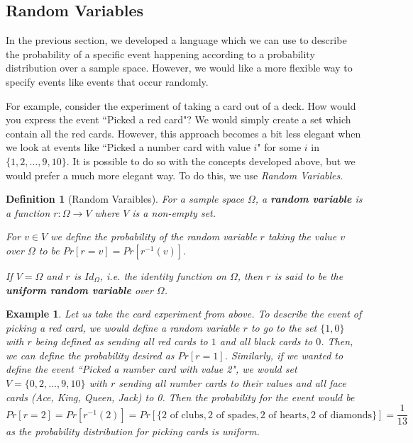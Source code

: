 \documentclass[12pt,a4paper]{article}
\newtheorem{definition}[theorem]{Definition}
\newtheorem{example}[theorem]{Example}
\begin{document}
\subsection{Random Variables}

In the previous section, we developed a language which we can use to describe
the probability of a specific event happening according to a probability
distribution over a sample space. However, we would like a more flexible way to
specify events like events that occur randomly. 

For example, consider the experiment of taking a card out of a deck. How would
you express the event ``Picked a red card"? We would simply create a set which
contain all the red cards. However, this approach becomes a bit less elegant
when we look at events like ``Picked a number card with value $i$" for some $i$
in $\{1,2,\ldots,9,10\}$. It is possible to do so with the concepts developed above, but
we would prefer a much more elegant way. To do this, we use \textit{Random
Variables}.

\begin{definition}[Random Varaibles]
For a sample space $\Omega$, a \textbf{random variable} is a function $r:\Omega
\rightarrow V$ where $V$ is a non-empty set.

For $v \in V$ we define the probability of the random variable $r$
taking the value $v$ over $\Omega$ to be $Pr[r=v] = Pr[r^{-1}(v)].$ 

If $V=\Omega$ and $r$ is $Id_\Omega$, i.e. the identity function on $\Omega$,
then $r$ is said to be the \textbf{uniform random variable} over $\Omega$.
\end{definition}
\begin{example}
Let us take the card experiment from above. To describe the event of picking a
red card, we would define a random variable $r$ to go to the set $\{1,0\}$ with $r$
being defined as sending all red cards to $1$ and all black cards to $0$. Then,
we can define the probability desired as $Pr[r=1]$. Similarly, if we wanted to define the
event ``Picked a number card with value 2", we would set $V =
\{0,2,\ldots,9,10\}$ with $r$ sending all number cards to their values and all
face cards (Ace, King, Queen, Jack) to 0. Then the probability for the event
would be \[Pr[r=2] = Pr[r^{-1}(2)] = Pr[\{2 \mbox{ of clubs} , 2 \mbox{ of
spades}, 2 \mbox{ of hearts}, 2 \mbox{ of diamonds}\}] = \frac{1}{13}\] as the
probability distribution for picking cards is uniform.
\end{example}
\end{document}
